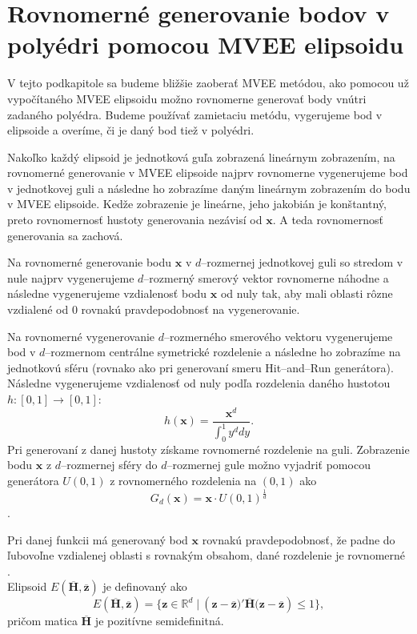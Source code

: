 \section[Rovnomerné generovanie pomocou MVEE elipsoidu]{Rovnomerné generovanie bodov v polyédri pomocou MVEE elipsoidu}

V tejto podkapitole sa budeme bližšie zaoberať MVEE metódou, ako pomocou už vypočítaného MVEE elipsoidu možno rovnomerne generovať body vnútri zadaného polyédra. Budeme používať zamietaciu metódu, vygerujeme bod v elipsoide a overíme, či je daný bod tiež v polyédri.

Nakoľko každý elipsoid je jednotková guľa zobrazená lineárnym zobrazením, na rovnomerné generovanie v MVEE elipsoide najprv rovnomerne vygenerujeme bod v jednotkovej guli a následne ho zobrazíme daným lineárnym zobrazením do bodu v MVEE elipsoide. Kedže zobrazenie je lineárne, jeho jakobián je konštantný, preto rovnomernosť hustoty generovania nezávisí od $\mathbf x$. A teda rovnomernosť generovania sa zachová.\\
\label{generovanie_v_mvee}

Na rovnomerné generovanie bodu $\mathbf x$ v $d$--rozmernej jednotkovej guli so stredom v nule najprv vygenerujeme $d$--rozmerný smerový vektor rovnomerne náhodne a následne vygenerujeme vzdialenosť bodu $\mathbf x$ od nuly tak, aby mali oblasti rôzne vzdialené od $0$ rovnakú pravdepodobnosť na vygenerovanie.

Na rovnomerné vygenerovanie $d$--rozmerného smerového vektoru vygenerujeme bod v $d$--rozmernom centrálne symetrické rozdelenie a následne ho zobrazíme na jednotkovú sféru (rovnako ako pri generovaní smeru Hit--and--Run generátora). Následne vygenerujeme vzdialenosť od nuly podľa rozdelenia daného hustotou $h:[0,1] \rightarrow [0,1]$: $$h(\mathbf x)=\frac{\mathbf x^d}{\int_0^1 y^d dy}.$$
Pri generovaní z danej hustoty získame rovnomerné rozdelenie na guli. Zobrazenie bodu $\mathbf x$ z $d$--rozmernej sféry do $d$--rozmernej gule možno vyjadriť pomocou generátora $U(0,1)$ z rovnomerného rozdelenia na $(0,1)$ ako 
$$G_d(\mathbf x)=\mathbf x\cdot U(0,1)^{\frac{1}{d}}$$.

Pri danej funkcii má generovaný bod $\mathbf x$ rovnakú pravdepodobnosť, že padne do ľubovoľne vzdialenej oblasti s rovnakým obsahom, dané rozdelenie je rovnomerné \cite{spheres_harman}.\\

Elipsoid $E(\mathbf{\overline H, \overline z})$ je definovaný ako 
$$E(\mathbf{\overline H, \overline z})= \{ \mathbf{z} \in \mathbb{R}^d \; | \: (\mathbf{z-\overline z)'\overline H(z-\overline z}) \le 1 \}, $$
pričom matica $\mathbf{\overline H}$ je pozitívne semidefinitná.

